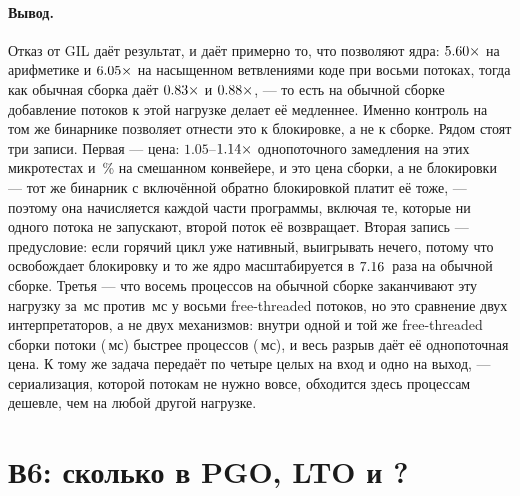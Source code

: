 \paragraph{Вывод.} Отказ от GIL даёт результат, и даёт примерно то, что позволяют ядра:
$\meas{ratio:b4_threads-ft:py_arith/ft/T1_control|b4_threads-ft:py_arith/ft/T8}{5.60}\times$ на арифметике и $\meas{ratio:b4_threads-ft:py_branchy/ft/T1|b4_threads-ft:py_branchy/ft/T8}{6.05}\times$ на насыщенном ветвлениями коде при восьми потоках, тогда
как обычная сборка даёт $\meas{ratio:b4_threads-gil:py_arith/gil/T1_control|b4_threads-gil:py_arith/gil/T8}{0.83}\times$ и $\meas{ratio:b4_threads-gil:py_branchy/gil/T1_control|b4_threads-gil:py_branchy/gil/T8}{0.88}\times$, --- то есть на обычной сборке добавление
потоков к этой нагрузке делает её медленнее. Именно контроль  на том же
бинарнике позволяет отнести это к блокировке, а не к сборке. Рядом стоят три записи. Первая --- цена:
$1.05$--$\meas{ratio:b4_threads-ft:single_thread_arith/ft|b4_threads-gil:single_thread_arith/gil}{1.14}\times$ однопоточного замедления на этих микротестах и \,\% на смешанном
конвейере, и это цена сборки, а не блокировки --- тот же бинарник с включённой обратно блокировкой
платит её тоже, --- поэтому она начисляется каждой части программы, включая те, которые ни одного
потока не запускают, второй поток её возвращает. Вторая запись --- предусловие: если горячий цикл
уже нативный, выигрывать нечего, потому что  освобождает блокировку и то же ядро
масштабируется в $\meas{ratio:b4_threads-gil:c_ffi_uniform/gil/T1|b4_threads-gil:c_ffi_uniform/gil/T8}{7.16}$~раза на обычной сборке. Третья --- что восемь процессов на обычной сборке
заканчивают эту нагрузку за \,мс против \,мс у восьми free-threaded потоков, но это
сравнение двух интерпретаторов, а не двух механизмов: внутри одной и той же free-threaded сборки
потоки (\,мс) быстрее процессов (\,мс), и весь разрыв даёт её однопоточная цена. К тому
же задача передаёт по четыре целых на вход и одно на выход, --- сериализация, которой потокам не
нужно вовсе, обходится здесь процессам дешевле, чем на любой другой нагрузке.

\section{В6: сколько в PGO, LTO и ?}
\label{sec:rq6}

